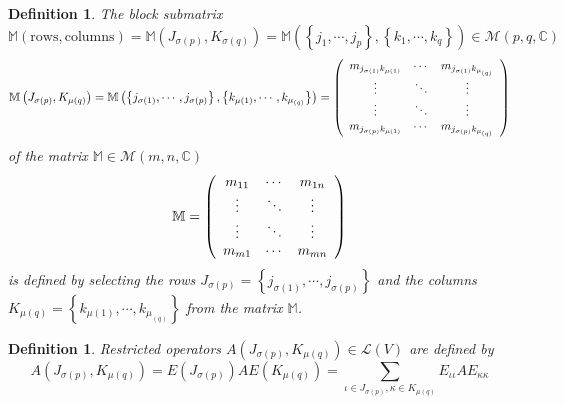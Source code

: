 \documentclass[aps,preprint]{revtex4}%
\newtheorem{definition}[theorem]{Definition}
\begin{document}
\begin{definition}
The block submatrix $\mathbb{M}\left(  \text{rows},\text{columns}\right)
=\mathbb{M}\left(  J_{\sigma\left(  p\right)  },K_{\sigma\left(  q\right)
}\right)  =\mathbb{M}\left(  \left\{  j_{1},\cdots,j_{p}\right\}  ,\left\{
k_{1},\cdots,k_{q}\right\}  \right)  \in\mathbb{\mathcal{M}}\left(
p,q,\mathbb{C}\right)  $%
\begin{equation}
\mathbb{M}\left(  J_{\sigma\left(  p\right)  },K_{\mu\left(  q\right)
}\right)  =\mathbb{M}\left(  \left\{  j_{\sigma\left(  1\right)  }%
,\cdots,j_{\sigma\left(  p\right)  }\right\}  ,\left\{  k_{\mu\left(
1\right)  },\cdots,k_{\mu_{\left(  q\right)  }}\right\}  \right)  =\left(
\begin{array}
[c]{ccc}%
m_{j_{\sigma\left(  1\right)  }k_{\mu\left(  1\right)  }} & \cdots &
m_{j_{\sigma\left(  1\right)  }k_{\mu_{\left(  q\right)  }}}\\
\vdots & \ddots & \vdots\\
\vdots & \ddots & \vdots\\
m_{j_{\sigma\left(  p\right)  }k_{\mu\left(  1\right)  }} & \cdots &
m_{j_{\sigma\left(  p\right)  }k_{\mu_{\left(  q\right)  }}}%
\end{array}
\right)
\end{equation}
of the matrix $\mathbb{M\in\mathcal{M}}\left(  m,n,\mathbb{C}\right)  $
\begin{equation}
\mathbb{M}=\left(
\begin{array}
[c]{ccc}%
m_{11} & \cdots & m_{1n}\\
\vdots & \ddots & \vdots\\
\vdots & \ddots & \vdots\\
m_{m1} & \cdots & m_{mn}%
\end{array}
\right)
\end{equation}
is defined by selecting the rows $J_{\sigma\left(  p\right)  }=\left\{
j_{\sigma\left(  1\right)  },\cdots,j_{\sigma\left(  p\right)  }\right\}  $
and the columns $K_{\mu\left(  q\right)  }=\left\{  k_{\mu\left(  1\right)
},\cdots,k_{\mu_{\left(  q\right)  }}\right\}  $ from the matrix $\mathbb{M}$.
\end{definition}

\begin{definition}
Restricted operators $A\left(  J_{\sigma\left(  p\right)  },K_{\mu\left(
q\right)  }\right)  \in\mathcal{L}\left(  V\right)  $ are defined by
\begin{equation}
A\left(  J_{\sigma\left(  p\right)  },K_{\mu\left(  q\right)  }\right)
=E\left(  J_{\sigma\left(  p\right)  }\right)  AE\left(  K_{\mu\left(
q\right)  }\right)  =\sum_{\iota\in J_{\sigma\left(  p\right)  },\kappa\in
K_{\mu\left(  q\right)  }}E_{\iota\iota}AE_{\kappa\kappa}%
\end{equation}

\end{definition}
\end{document}
